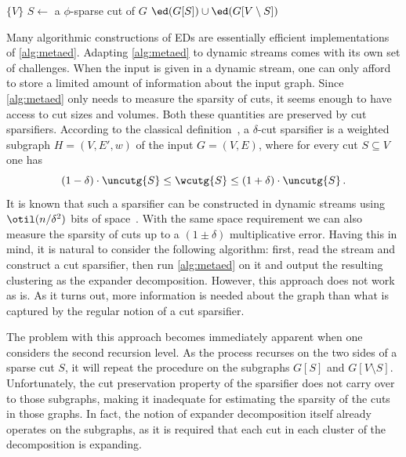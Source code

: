 \begin{algorithm}[H]
	\caption{\ed: recursive procedure for computing a $(O(\phi \log n), \phi)$-ED of $G$}
	\label{alg:metaed}
	
	\begin{algorithmic}[1]
		 
		
		 \Return $\{V\}$
		\Else
		\State $S \gets $ a $\phi$-sparse cut of $G$ \label{eq:sparsecut}
		\State \Return $\ed(G[S]) \cup \ed(G[V \setminus S])$
		\EndIf
		
		\EndProcedure
	\end{algorithmic}
\end{algorithm}
\noindent
Many algorithmic constructions of EDs are essentially efficient implementations of \cref{alg:metaed}. Adapting \cref{alg:metaed} to dynamic streams comes with its own set of challenges.
When the input is given in a dynamic stream, one can only afford to store a limited amount of information about the input graph. Since \cref{alg:metaed} only needs to measure the sparsity of cuts, it seems enough to have access to cut sizes and volumes. Both these quantities are preserved by cut sparsifiers. According to the classical definition~\cite{benczurkarger}, a $\delta$-cut sparsifier is a weighted subgraph $H=(V,E',w)$ of the input $G=(V,E)$, where for every cut $S \subseteq V$ one has
\begin{equation*}
	(1-\delta)\cdot \uncutg{S} \le \wcutg{S}\le (1+\delta) \cdot \uncutg{S} \, .
\end{equation*}
It is known that such a sparsifier can be constructed in dynamic streams using $\otil(n/\delta^2)$ bits of space~\cite{sparsdynamicstreams}. With the same space requirement we can also measure the sparsity of cuts up to a $(1\pm \delta)$ multiplicative error. Having this in mind, it is natural to consider the following algorithm: first, read the stream and construct a cut sparsifier, then run \cref{alg:metaed} on it and output the resulting clustering as the expander decomposition. However, this approach does not work as is. As it turns out, more information is needed about the graph than what is captured by the regular notion of a cut sparsifier.

The problem with this approach becomes immediately apparent when one considers the second recursion level. As the process recurses on the two sides of a sparse cut $S$, it will repeat the procedure on the subgraphs $G[S]$ and $G[V \setminus S]$. Unfortunately, the cut preservation property of the sparsifier does not carry over to those subgraphs, making it inadequate for estimating the sparsity of the cuts in those graphs. 
In fact, the notion of expander decomposition itself already operates on the subgraphs, as it is required that each cut in each cluster of the decomposition is expanding.

